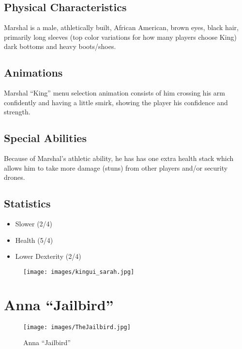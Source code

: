 \documentclass[11pt]{report}
\begin{document}
\subsection{Physical Characteristics}

Marshal is a male, athletically built, African American, brown eyes, black hair, primarily long sleeves (top color variations for how many players choose King) dark bottoms and heavy boots/shoes.

\subsection{Animations}

Marshal “King” menu selection animation consists of him crossing his arm confidently and having a little smirk, showing the player his confidence and strength.

\subsection{Special Abilities}

Because of Marshal’s athletic ability, he has has one extra health stack which allows him to take more damage (stuns) from other players and/or security drones.

\subsection{Statistics}

\begin{itemize}
    \item Slower (2/4)
    \item Health (5/4)
    \item Lower Dexterity (2/4)
\end{itemize}

\begin{figure}[H]
    \centering
    \texttt{[image: images/kingui\_sarah.jpg]}
    \caption{}
\end{figure}

\section{Anna ``Jailbird''}
\begin{figure}[H]
    \centering
    \texttt{[image: images/TheJailbird.jpg]}
    \caption{Anna ``Jailbird''}
\end{figure}
\end{document}
